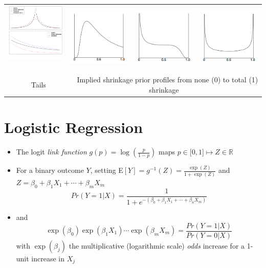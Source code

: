 \documentclass[11pt, oneside]{article}
\begin{document}
\begin{tabular}{rrrr}
 \includegraphics[width=1.15in]{regularization_prior2.png}\textcolor{white}{...}
 &
 \includegraphics[width=1.3in]{regularization_prior4_L.png} &
  \includegraphics[width=1.3in]{regularization_prior4_C.png} &
 \includegraphics[width=1.3in]{regularization_prior4_H.png} \\
\multicolumn{1}{c}{$\quad$Tails}& \multicolumn{3}{c}{$\quad$Implied shrinkage prior profiles from none (0) to total (1) shrinkage}
  \end{tabular}
 



\newpage
\section{Logistic Regression}

\begin{itemize}
\item  The logit \emph{link function} $g(p) = \log\left(\frac{p}{1-p}\right)$ maps $p \in {[}0,1{]} \mapsto Z \in \mathbb{R}$
\item  For a binary outcome $Y$, setting E$\left[Y\right] = g^{-1}(Z) = \frac{\exp(Z)}{1+\exp(Z)}$ and $Z =  \beta_0 + \beta_1X_{1} + \cdots + \beta_mX_m$ 
$$Pr(Y=1|X)  = \frac{1}{1 + e^{-(\beta_0 + \beta_1X_{1} + \cdots + \beta_nX_m )}}$$
\item[] and 
$$ \exp(\beta_0)\exp(\beta_1X_{1})\cdots\exp(\beta_mX_{m}) = \frac{Pr(Y=1|X)}{Pr(Y=0|X)} $$ 
with  
$\exp(\beta_j)$  the multiplicative (logarithmic scale) \emph{odds} increase for a 1-unit increase in $X_{j}$
\end{itemize}
\end{document}
